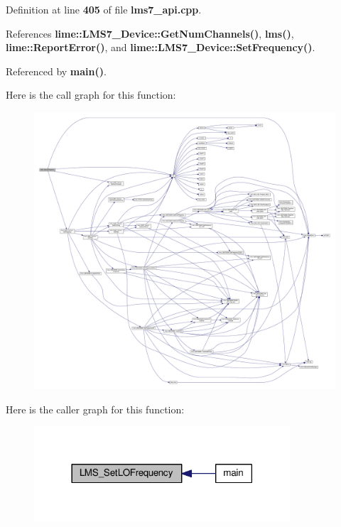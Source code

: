 Definition at line {\bf 405} of file {\bf lms7\+\_\+api.\+cpp}.



References {\bf lime\+::\+L\+M\+S7\+\_\+\+Device\+::\+Get\+Num\+Channels()}, {\bf lms()}, {\bf lime\+::\+Report\+Error()}, and {\bf lime\+::\+L\+M\+S7\+\_\+\+Device\+::\+Set\+Frequency()}.



Referenced by {\bf main()}.



Here is the call graph for this function\+:
\nopagebreak
\begin{figure}[H]
\begin{center}
\leavevmode
\includegraphics[width=350pt]{df/de1/lms7__api_8cpp_a2c59e97985e0dfccf935c8bd78d5248d_cgraph}
\end{center}
\end{figure}




Here is the caller graph for this function\+:
\nopagebreak
\begin{figure}[H]
\begin{center}
\leavevmode
\includegraphics[width=270pt]{df/de1/lms7__api_8cpp_a2c59e97985e0dfccf935c8bd78d5248d_icgraph}
\end{center}
\end{figure}



